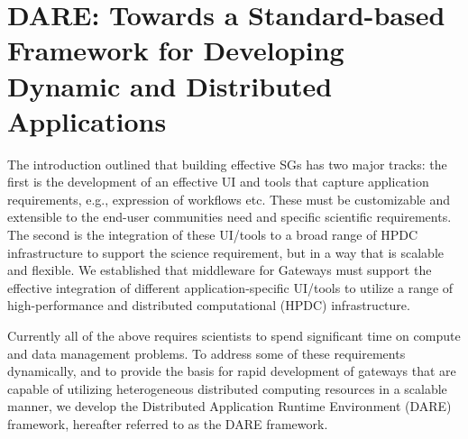 \documentclass[]{svjour3}
\begin{document}








\section{DARE: Towards a Standard-based Framework for Developing
  Dynamic and Distributed Applications}


The introduction outlined that building effective SGs has two major
tracks: the first is the development of an effective UI and tools that
capture application requirements, e.g., expression of workflows etc.
These must be customizable and extensible to the end-user communities
need and specific scientific requirements. The second is the
integration of these UI/tools to a broad range of HPDC infrastructure
to support the science requirement, but in a way that is scalable and
flexible. We established that middleware for Gateways must support the
effective integration of different application-specific UI/tools to
utilize a range of high-performance and distributed computational
(HPDC) infrastructure.

Currently all of the above requires scientists to spend significant
time on compute and data management problems.  To address some of
these requirements dynamically, and to provide the basis for rapid
development of gateways that are capable of utilizing heterogeneous
distributed computing resources in a scalable manner, we develop the
Distributed Application Runtime Environment (DARE)
framework\cite{dareurl}, hereafter referred to as the DARE framework.
\end{document}
